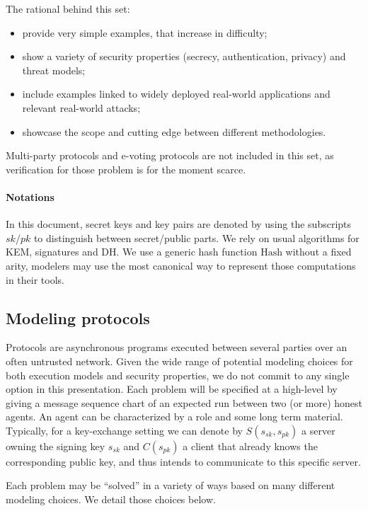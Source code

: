 \documentclass{article}
\newcommand{\sfsk}{\mathit{sk}}
\newcommand{\sfpk}{\mathit{pk}}
\newcommand{\kwf}[1]{\mathrm{#1}}
\newcommand{\hash}{\kwf{Hash}}
\begin{document}
The rational behind this set:
\begin{itemize}
\item provide very simple examples, that increase in difficulty;
\item show a variety of security properties (secrecy, authentication, privacy) and threat models;
\item include examples linked to widely deployed real-world applications and relevant real-world attacks;
\item showcase the scope and cutting edge between different methodologies.
\end{itemize}

Multi-party protocols and e-voting protocols are not included in this set, as verification for those problem is for the moment scarce.

\paragraph{Notations} In this document, secret keys and key pairs are denoted by using the subscripts $\sfsk$/$\sfpk$ to distinguish between secret/public parts. We rely on usual algorithms for KEM, signatures and DH. We use a generic hash function $\hash$ without a fixed arity, modelers may use the most canonical way to represent those computations in their tools.


\subsection{Modeling protocols}

Protocols are asynchronous programs executed between several parties over an often untrusted network. Given the wide range of potential modeling choices for both execution models and security properties, we do not commit to any single option in this presentation. Each problem will be specified at a high-level by giving a message sequence chart of an expected run between two (or more) honest agents. An agent can be characterized by a role and some long term material. Typically, for a key-exchange setting we can denote by $S(s_\sfsk,s_\sfpk)$ a server owning the signing key $s_\sfsk$ and $C(s_\sfpk)$ a client that already knows the corresponding public key, and thus intends to communicate to this specific server.


Each problem may be ``solved'' in a variety of ways based on many different modeling choices. We detail those choices below.
\end{document}
